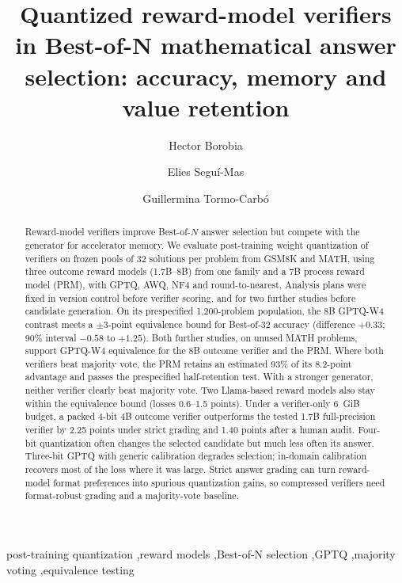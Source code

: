 \documentclass[review,12pt]{elsarticle}
\begin{document}
\begin{frontmatter}

\title{Quantized reward-model verifiers in Best-of-N mathematical answer selection:
accuracy, memory and value retention}

\author[a]{Hector Borobia}
\author[b]{Elies Segu\'{i}-Mas}
\author[c]{Guillermina Tormo-Carb\'{o}}


\begin{abstract}
Reward-model verifiers improve Best-of-$N$ answer selection but compete with the
generator for accelerator memory. We evaluate post-training weight quantization of
verifiers on frozen pools of 32 solutions per problem from GSM8K and MATH, using three
outcome reward models (1.7B--8B) from one family and a 7B process reward model (PRM),
with GPTQ, AWQ, NF4 and round-to-nearest. Analysis plans were fixed in version control
before verifier scoring, and for two further studies before candidate generation. On
its prespecified 1,200-problem population, the 8B GPTQ-W4 contrast meets a $\pm3$-point
equivalence bound for Best-of-32 accuracy (difference $+0.33$; 90\% interval $-0.58$ to
$+1.25$). Both further studies, on unused MATH problems, support GPTQ-W4 equivalence for
the 8B outcome verifier and the PRM. Where both verifiers beat majority vote, the PRM
retains an estimated 93\% of its 8.2-point advantage and passes the prespecified
half-retention test. With a stronger generator, neither verifier clearly beat majority
vote. Two Llama-based reward models also stay within the equivalence bound (losses
0.6--1.5 points). Under a verifier-only 6~GiB budget, a packed 4-bit 4B outcome verifier
outperforms the tested 1.7B full-precision verifier by 2.25 points under strict grading
and 1.40 points after a human audit.
Four-bit quantization often changes the selected candidate but much less often its
answer. Three-bit GPTQ with generic calibration degrades selection; in-domain
calibration recovers most of the loss where it was large. Strict answer
grading can turn reward-model format preferences into spurious quantization gains, so
compressed verifiers need format-robust grading and a majority-vote baseline.
\end{abstract}

\begin{keyword}
post-training quantization \sep reward models \sep Best-of-N selection \sep GPTQ
\sep majority voting \sep equivalence testing
\end{keyword}

\end{frontmatter}











\appendix

\end{document}
